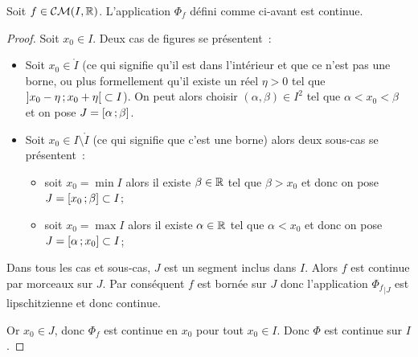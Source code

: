 \begin{prop}
  Soit \(f \in \mathcal{CM}(I,\mathbb{R})\). L'application \(\Phi_f\) défini comme ci-avant est 
  continue.
\end{prop}
\begin{proof}
  Soit \(x_0 \in I\). Deux cas de figures se présentent~:
  \begin{itemize}
    \item Soit \(x_0 \in \mathring{I}\) (ce qui signifie qu'il est dans 
      l'intérieur et que ce n'est pas une borne, ou plus formellement qu'il 
      existe un réel \(\eta>0\) tel que \(\left] x_0-\eta \, ; {} x_0+\eta \right[ 
      \subset I\)). On peut alors choisir \((\alpha,\beta) \in I^2\) tel que 
      \(\alpha < x_0 < \beta\) et on pose \(J = \left[ \alpha \, ; {} \beta \right]\).
    \item Soit \(x_0 \in I\setminus\mathring{I}\) (ce qui signifie que c'est une 
      borne) alors deux sous-cas se présentent~:
      \begin{itemize}
        \item soit \(x_0 = \min I\) alors il existe \(\beta \in \mathbb{R}\) tel que 
          \(\beta > x_0\) et donc on pose \(J = \left[ x_0 \, ; {} \beta \right] \subset 
          I\);
        \item soit \(x_0 = \max I\) alors il existe \(\alpha \in \mathbb{R}\) tel que 
          \(\alpha < x_0\) et donc on pose \(J = \left[ \alpha \, ; {} x_0 \right] 
          \subset I\);
      \end{itemize}
  \end{itemize}

  Dans tous les cas et sous-cas, \(J\) est un segment inclus dans \(I\). Alors 
  \(f\) est continue par morceaux sur \(J\). Par conséquent \(f\) est bornée sur 
  \(J\) donc l'application \({\Phi_f}_{|J}\) est lipschitzienne et donc 
  continue.

  Or \(x_0 \in J\), donc \(\Phi_f\) est continue en \(x_0\) pour tout \(x_0 \in 
  I\). Donc \(\Phi\) est continue sur \(I\).
\end{proof}

